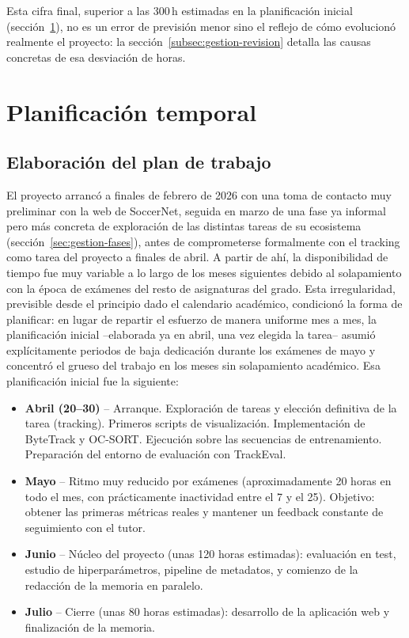 Esta cifra final, superior a las 300\,h estimadas en la planificación
inicial (sección~\ref{sec:gestion-planificacion}), no es un error de
previsión menor sino el reflejo de cómo evolucionó realmente el proyecto:
la sección~\ref{subsec:gestion-revision} detalla las causas concretas de
esa desviación de horas.

\section{Planificación temporal}
\label{sec:gestion-planificacion}

\subsection{Elaboración del plan de trabajo}

El proyecto arrancó a finales de febrero de 2026 con una toma de contacto
muy preliminar con la web de SoccerNet, seguida en marzo de una fase ya
informal pero más concreta de exploración de las distintas tareas de su
ecosistema (sección~\ref{sec:gestion-fases}), antes de comprometerse
formalmente con el tracking como tarea del proyecto a finales de abril. A
partir de ahí,
la disponibilidad de tiempo fue muy variable a lo largo de los meses
siguientes debido al solapamiento con la época de exámenes del resto de
asignaturas del grado. Esta irregularidad, previsible desde el principio
dado el calendario académico, condicionó la forma de planificar: en lugar
de repartir el esfuerzo de manera uniforme mes a mes, la planificación
inicial --elaborada ya en abril, una vez elegida la tarea-- asumió
explícitamente periodos de baja dedicación durante los exámenes de mayo y
concentró el grueso del trabajo en los meses sin solapamiento académico.
Esa planificación inicial fue la siguiente:

\begin{itemize}
  \item \textbf{Abril (20--30)} -- Arranque. Exploración de tareas y
        elección definitiva de la tarea (tracking). Primeros scripts de
        visualización. Implementación de ByteTrack y OC-SORT. Ejecución
        sobre las secuencias de entrenamiento. Preparación del entorno de
        evaluación con TrackEval.
  \item \textbf{Mayo} -- Ritmo muy reducido por exámenes (aproximadamente
        20 horas en todo el mes, con prácticamente inactividad entre el 7 y
        el 25). Objetivo: obtener las primeras métricas reales y mantener
        un feedback constante de seguimiento con el tutor.
  \item \textbf{Junio} -- Núcleo del proyecto (unas 120 horas estimadas):
        evaluación en test, estudio de hiperparámetros, pipeline de
        metadatos, y comienzo de la redacción de la memoria en paralelo.
  \item \textbf{Julio} -- Cierre (unas 80 horas estimadas): desarrollo de la
        aplicación web y finalización de la memoria.
\end{itemize}

